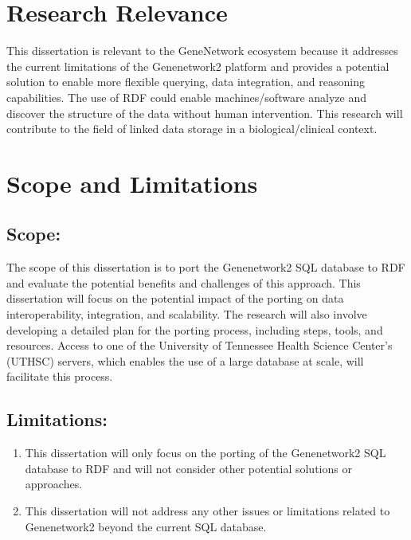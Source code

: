 \section{Research Relevance}

This dissertation is relevant to the GeneNetwork ecosystem because it addresses the current limitations of the Genenetwork2 platform and provides a potential solution to enable more flexible querying, data integration, and reasoning capabilities.  The use of RDF could enable machines/software analyze and discover the structure of the data without human intervention.  This research will contribute to the field of linked data storage in a biological/clinical context.

\section{Scope and Limitations}
\subsection*{Scope:}

The scope of this dissertation is to port the Genenetwork2 SQL database to RDF and evaluate the potential benefits and challenges of this approach.  This dissertation will focus on the potential impact of the porting on data interoperability, integration, and scalability.  The research will also involve developing a detailed plan for the porting process, including steps, tools, and resources.  Access to one of the University of Tennessee Health Science Center's (UTHSC) servers, which enables the use of a large database at scale, will facilitate this process.

\subsection*{Limitations:}

\begin{enumerate}
\item This dissertation will only focus on the porting of the Genenetwork2 SQL database to RDF and will not consider other potential solutions or approaches.
\item This dissertation will not address any other issues or limitations related to Genenetwork2 beyond the current SQL database.
\end{enumerate}
